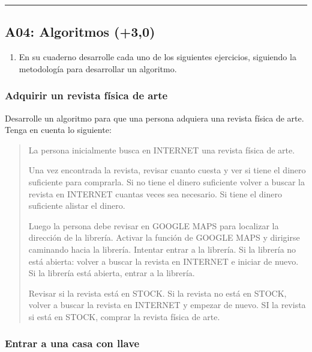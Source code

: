 \documentclass[letterpaper,10pt,spanish]{sphinxmanual}
\begin{document}
\bigskip\hrule\bigskip



\subsection{A04: Algoritmos (+3,0)}
\label{\detokenize{1_guias/10programacion/G1023:a04-algoritmos-3-0}}
\sphinxAtStartPar
{}
\begin{enumerate}
%
\item {} 
\sphinxAtStartPar
En su cuaderno desarrolle cada uno de los siguientes ejercicios, siguiendo la metodología para desarrollar un algoritmo.

\end{enumerate}
\subsubsection*{Adquirir un revista física de arte}

\sphinxAtStartPar
Desarrolle un algoritmo para que una persona adquiera una revista física de arte. Tenga en cuenta lo siguiente:
\begin{quote}

\sphinxAtStartPar
La persona inicialmente busca en INTERNET una revista física de arte.

\sphinxAtStartPar
Una vez encontrada la revista, revisar cuanto cuesta y ver si tiene el dinero suficiente para comprarla. Si no tiene el dinero suficiente volver a buscar la revista en INTERNET cuantas veces sea necesario. Si tiene el dinero suficiente alistar el dinero.

\sphinxAtStartPar
Luego la persona debe revisar en GOOGLE MAPS para localizar la dirección de la librería. Activar la función de GOOGLE MAPS y dirigirse caminando hacia la librería. Intentar entrar a la librería. Si la librería no está abierta: volver a buscar la revista en INTERNET e iniciar de nuevo. Si la librería está abierta, entrar a la librería.

\sphinxAtStartPar
Revisar si la revista está en STOCK. Si la revista no está en STOCK, volver a buscar la revista en INTERNET y empezar de nuevo. SI la revista si está en STOCK, comprar la revista física de arte.
\end{quote}
\subsubsection*{Entrar a una casa con llave}
\end{document}
